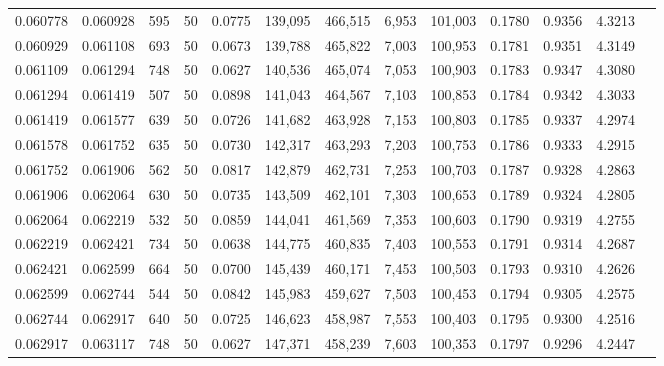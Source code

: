 \begin{tabular}{rrrrrrrrrrrrr}
0.060778 & 0.060928 &   595 &  50 &                                     0.0775 & 139,095 & 466,515 &   6,953 & 101,003 & 0.1780 & 0.9356 & 4.3213 \\
0.060929 & 0.061108 &   693 &  50 &                                     0.0673 & 139,788 & 465,822 &   7,003 & 100,953 & 0.1781 & 0.9351 & 4.3149 \\
0.061109 & 0.061294 &   748 &  50 &                                     0.0627 & 140,536 & 465,074 &   7,053 & 100,903 & 0.1783 & 0.9347 & 4.3080 \\
0.061294 & 0.061419 &   507 &  50 &                                     0.0898 & 141,043 & 464,567 &   7,103 & 100,853 & 0.1784 & 0.9342 & 4.3033 \\
0.061419 & 0.061577 &   639 &  50 &                                     0.0726 & 141,682 & 463,928 &   7,153 & 100,803 & 0.1785 & 0.9337 & 4.2974 \\
0.061578 & 0.061752 &   635 &  50 &                                     0.0730 & 142,317 & 463,293 &   7,203 & 100,753 & 0.1786 & 0.9333 & 4.2915 \\
0.061752 & 0.061906 &   562 &  50 &                                     0.0817 & 142,879 & 462,731 &   7,253 & 100,703 & 0.1787 & 0.9328 & 4.2863 \\
0.061906 & 0.062064 &   630 &  50 &                                     0.0735 & 143,509 & 462,101 &   7,303 & 100,653 & 0.1789 & 0.9324 & 4.2805 \\
0.062064 & 0.062219 &   532 &  50 &                                     0.0859 & 144,041 & 461,569 &   7,353 & 100,603 & 0.1790 & 0.9319 & 4.2755 \\
0.062219 & 0.062421 &   734 &  50 &                                     0.0638 & 144,775 & 460,835 &   7,403 & 100,553 & 0.1791 & 0.9314 & 4.2687 \\
0.062421 & 0.062599 &   664 &  50 &                                     0.0700 & 145,439 & 460,171 &   7,453 & 100,503 & 0.1793 & 0.9310 & 4.2626 \\
0.062599 & 0.062744 &   544 &  50 &                                     0.0842 & 145,983 & 459,627 &   7,503 & 100,453 & 0.1794 & 0.9305 & 4.2575 \\
0.062744 & 0.062917 &   640 &  50 &                                     0.0725 & 146,623 & 458,987 &   7,553 & 100,403 & 0.1795 & 0.9300 & 4.2516 \\
0.062917 & 0.063117 &   748 &  50 &                                     0.0627 & 147,371 & 458,239 &   7,603 & 100,353 & 0.1797 & 0.9296 & 4.2447 \\

\end{tabular}

